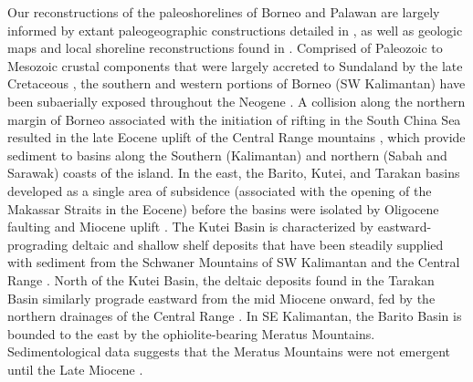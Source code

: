 \documentclass[11pt,letterpaper]{article}
\begin{document}
Our reconstructions of the paleoshorelines of Borneo and Palawan are largely informed by extant paleogeographic constructions detailed in \citet{Hall2001a, Hall2013a, Hall2013b},  as well as geologic maps and local shoreline reconstructions found in \citet{vandeWeerd1992a, Witts2012a, Madon2013a, Kessler2015a}. Comprised of Paleozoic to Mesozoic crustal components that were largely accreted to Sundaland by the late Cretaceous \citep{Metcalfe2013a}, the southern and western portions of Borneo (SW Kalimantan) have been subaerially exposed throughout the Neogene \citep{Hall2013a, Hall2013b}. A collision along the northern margin of Borneo associated with the initiation of rifting in the South China Sea resulted in the late Eocene uplift of the Central Range mountains \citep{Hutchison1996a}, which provide sediment to basins along the Southern (Kalimantan) and northern (Sabah and Sarawak) coasts of the island. In the east, the Barito, Kutei, and Tarakan basins developed as a single area of subsidence (associated with the opening of the Makassar Straits in the Eocene) before the basins were isolated by Oligocene faulting and Miocene uplift \citep{Witts2012a}. The Kutei Basin is characterized by eastward-prograding deltaic and shallow shelf deposits that have been steadily supplied with sediment from the Schwaner Mountains of SW Kalimantan and the Central Range \citep{vandeWeerd1992a}. North of the Kutei Basin, the deltaic deposits found in the Tarakan Basin similarly prograde eastward from the mid Miocene onward, fed by the northern drainages of the Central Range \citep{Satyana1999a}. In SE Kalimantan, the Barito Basin is bounded to the east by the ophiolite-bearing Meratus Mountains. Sedimentological data suggests that the Meratus Mountains were not emergent until the Late Miocene \citep{Witts2012a}.
\end{document}
